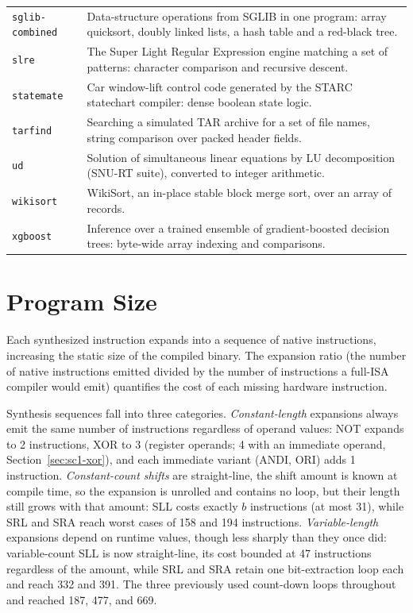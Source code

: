 \begin{table}[htb]
\begin{tabular}{@{}lp{10.2cm}@{}}
\texttt{sglib-combined} & Data-structure operations from SGLIB in one program: array quicksort,
                          doubly linked lists, a hash table and a red-black tree. \\
\texttt{slre}           & The Super Light Regular Expression engine matching a set of patterns:
                          character comparison and recursive descent. \\
\texttt{statemate}      & Car window-lift control code generated by the STARC statechart compiler:
                          dense boolean state logic. \\
\texttt{tarfind}        & Searching a simulated TAR archive for a set of file names, string comparison
                          over packed header fields. \\
\texttt{ud}             & Solution of simultaneous linear equations by LU decomposition (SNU-RT suite),
                          converted to integer arithmetic. \\
\texttt{wikisort}       & WikiSort, an in-place stable block merge sort, over an array of records. \\
\texttt{xgboost}        & Inference over a trained ensemble of gradient-boosted decision trees:
                          byte-wide array indexing and comparisons. \\
\bottomrule
\end{tabular}
\end{table}

\section{Program Size} \label{sec:embench-size}

Each synthesized instruction expands into a sequence of native instructions, increasing the static
size of the compiled binary. The expansion ratio (the number of native instructions emitted divided
by the number of instructions a full-ISA compiler would emit) quantifies the cost of each missing
hardware instruction.

Synthesis sequences fall into three categories. \textit{Constant-length}
expansions always emit the same number of instructions regardless of operand values: NOT expands to 2
instructions, XOR to 3 (register operands; 4 with an immediate operand, Section~\ref{sec:sc1-xor}),
and each immediate variant (ANDI, ORI) adds 1 instruction. \textit{Constant-count shifts} are
straight-line, the shift amount is known at compile time, so the expansion is unrolled and contains
no loop, but their length still grows with that amount: SLL costs exactly $b$ instructions (at most
31), while SRL and SRA reach worst cases of 158 and 194 instructions. \textit{Variable-length}
expansions depend on runtime values, though less sharply than they once did: variable-count SLL is now
straight-line, its cost bounded at 47 instructions regardless of the amount, while SRL and SRA retain
one bit-extraction loop each and reach 332 and 391. The three previously used count-down loops
throughout and reached 187, 477, and 669.

